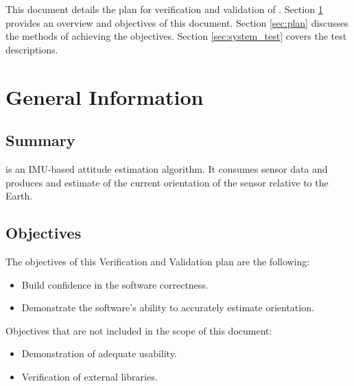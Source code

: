 \documentclass[12pt, titlepage]{article}
\begin{document}
This document details the plan for verification and validation of \progname{}. Section
\ref{sec:general} provides an overview and objectives of this document. Section \ref{sec:plan}
discusses the methods of achieving the objectives. Section \ref{sec:system_test} covers the test
descriptions.


\section{General Information} \label{sec:general}

\subsection{Summary}

\progname{} is an IMU-based attitude estimation algorithm. It consumes sensor data and produces and
estimate of the current orientation of the sensor relative to the Earth.


\subsection{Objectives}

The objectives of this Verification and Validation plan are the following:

\begin{itemize}
    \item Build confidence in the software correctness.
    \item Demonstrate the software's ability to accurately estimate orientation.
\end{itemize}


\noindent
Objectives that are not included in the scope of this document:

\begin{itemize}
    \item Demonstration of adequate usability.
    \item Verification of external libraries.
\end{itemize}
\end{document}
